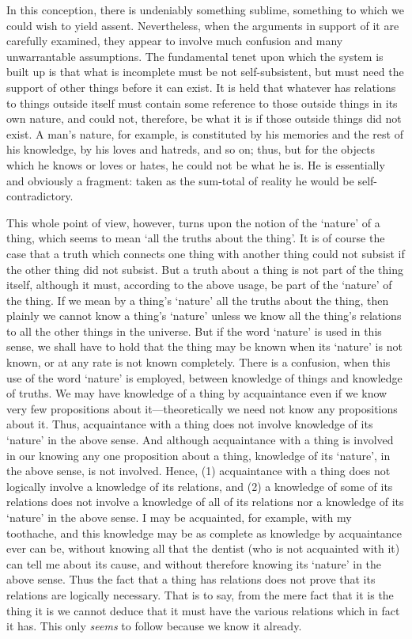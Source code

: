 \documentclass[oneside,letterpaper,12pt]{book}
\begin{document}
In this conception, there is undeniably something sublime, something to
which we could wish to yield assent. Nevertheless, when the arguments in
support of it are carefully examined, they appear to involve much
confusion and many unwarrantable assumptions. The fundamental tenet upon
which the system is built up is that what is incomplete must be not
self-subsistent, but must need the support of other things before it can
exist. It is held that whatever has relations to things outside itself
must contain some reference to those outside things in its own nature,
and could not, therefore, be what it is if those outside things did not
exist. A man's nature, for example, is constituted by
his memories and the rest of his knowledge, by his loves and hatreds,
and so on; thus, but for the objects which he knows or loves or hates,
he could not be what he is. He is essentially and obviously a fragment:
taken as the sum-total of reality he would be self-contradictory.

This whole point of view, however, turns upon the notion of the
`nature' of a thing, which seems to
mean `all the truths about the thing'. It
is of course the case that a truth which connects one thing with another
thing could not subsist if the other thing did not subsist. But a truth
about a thing is not part of the thing itself, although it must,
according to the above usage, be part of the
`nature' of the thing. \label{nature} If we mean by a
thing's `nature' all
the truths about the thing, then plainly we cannot know a
thing's `nature' unless
we know all the thing's relations to all the other
things in the universe. But if the word
`nature' is used in this sense, we
shall have to hold that the thing may be known when its
`nature' is not known, or at any rate
is not known completely. There is a confusion, when this use of the word
`nature' is employed, between knowledge
of things and knowledge of truths. We may have knowledge of a thing by
acquaintance even if we know very few propositions about
it---theoretically we need not know any propositions about it. Thus,
acquaintance with a thing does not involve knowledge of its
`nature' in the above sense. And
although acquaintance with a thing is involved in our knowing any one
proposition about a thing, knowledge of its
`nature', in the above sense, is not
involved. Hence, (1) acquaintance with a thing does not logically
involve a knowledge of its relations, and (2) a knowledge of some of its
relations does not involve a knowledge of all of its relations nor a
knowledge of its `nature' in the above
sense. I may be acquainted, for example, with my toothache, and this
knowledge may be as complete as knowledge by acquaintance ever can be,
without knowing all that the dentist (who is not acquainted with it) can
tell me about its cause, and without therefore knowing its
`nature' in the above sense. Thus the
fact that a thing has relations does not prove that its relations are
logically necessary. That is to say, from the mere fact that it is the
thing it is we cannot deduce that it must have the various relations
which in fact it has. This only \emph{seems} to follow because we know
it already.
\end{document}
